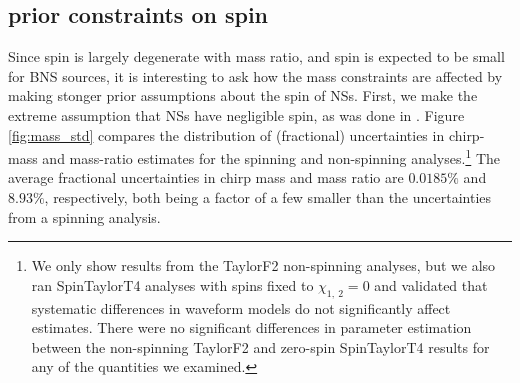 \subsection{prior constraints on spin}
\label{subsec:prior_constraints}

Since spin is largely degenerate with mass ratio, and spin is expected to be small for BNS sources, it is interesting to ask how the mass constraints are affected by making stonger prior assumptions about the spin of NSs.  First, we make the extreme assumption that NSs have negligible spin, as was done in \citet{Singer_2014}.  Figure \ref{fig:mass_std} compares the distribution of (fractional) uncertainties in chirp-mass and mass-ratio estimates for the spinning and non-spinning analyses.\footnote{We only show results from the TaylorF2 non-spinning analyses, but we also ran SpinTaylorT4 analyses with spins fixed to $\chi_{1,~2}=0$ and validated that systematic differences in waveform models do not significantly affect estimates. There were no significant differences in parameter estimation between the non-spinning TaylorF2 and zero-spin SpinTaylorT4 results for any of the quantities we examined.} The average fractional uncertainties in chirp mass and mass ratio are $0.0185\%$ and $8.93\%$, respectively, both being a factor of a few smaller than the uncertainties from a spinning analysis.
  
  
  
  
  